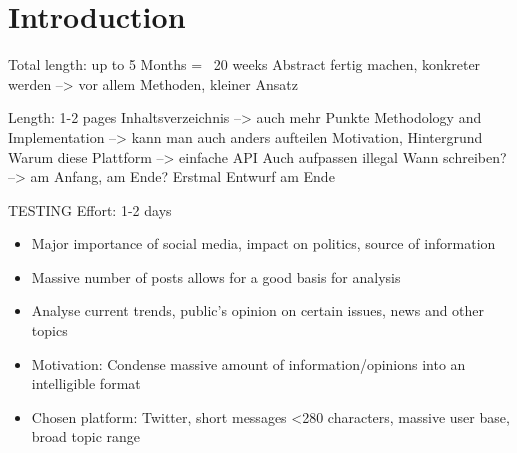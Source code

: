 \chapter{Introduction}
\label{cha:Chapter1_Introduction}
Total length: up to 5 Months = ~20 weeks
Abstract fertig machen, konkreter werden --> vor allem Methoden, kleiner Ansatz

Length: 1-2 pages
Inhaltsverzeichnis --> auch mehr Punkte
Methodology and Implementation --> kann man auch anders aufteilen
Motivation, Hintergrund
Warum diese Plattform --> einfache API
Auch aufpassen illegal
Wann schreiben? --> am Anfang, am Ende? Erstmal Entwurf am Ende

TESTING
Effort: 1-2 days
\begin{itemize}
\item Major importance of social media, impact on politics, source of information
\item Massive number of posts allows for a good basis for analysis
\item Analyse current trends, public's opinion on certain issues, news and other topics
\item Motivation: Condense massive amount of information/opinions into an intelligible format
\item Chosen platform: Twitter, short messages <280 characters, massive user base, broad topic range
\end{itemize}


